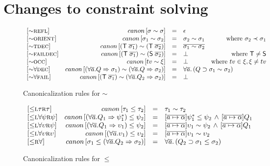 \documentclass[12pt]{article}
\begin{document}
\section{Changes to constraint solving}

\begin{figure}
$$
\begin{array}{lrclr}
\textsc{[$\sim$refl]} & canon\left[\sigma \sim \sigma\right] & = & \epsilon \\
\textsc{[$\sim$orient]} & canon\left[\sigma_1 \sim \sigma_2\right] & = & \sigma_2 \sim \sigma_1
& \textrm{where } \sigma_2 \prec \sigma_1 \\
\textsc{[$\sim$tdec]} & canon\left[(\mathsf{T} \; \overline{\sigma_1}) \sim (\mathsf{T} \; \overline{\sigma_2})\right] & = & \overline{\sigma_1 \sim \sigma_2} \\
\textsc{[$\sim$faildec]} & canon\left[(\mathsf{T} \; \overline{\sigma_1}) \sim (\mathsf{S} \; \overline{\sigma_2})\right] & = & \bot
 & \textrm{where } \mathsf{T} \neq \mathsf{S} \\
\textsc{[$\sim$occ]} & canon\left[tv \sim \xi \right] & = & \bot & \textrm{where } tv \in \xi, \xi \neq tv \\
\textsc{[$\sim$$\forall$dec]} & canon\left[(\forall \overline{a}. Q \Rightarrow \sigma_1) \sim (\forall \overline{a}. Q \Rightarrow \sigma_2)\right] & = & \multicolumn{2}{l}{\forall \overline{a}. \, (Q \supset \sigma_1 \sim \sigma_2)} \\
\textsc{[$\sim$$\forall$fail]} & canon\left[(\mathsf{T} \; \overline{\sigma_1}) \sim (\forall \overline{a}. Q_2 \Rightarrow \sigma_2)\right] & = & \bot \\
\end{array}
$$
\caption{Canonicalization rules for $\sim$}
\label{fig:sim}
\end{figure}

\begin{figure}
$$
\begin{array}{lrcl}
\textsc{[$\leq$l$\tau$r$\tau$]} & canon\left[\tau_1 \leq \tau_2\right] & = & \tau_1 \sim \tau_2 \\
\textsc{[$\leq$l$\forall\psi$r$\psi$]} & canon\left[(\forall \overline{a}. Q_1 \Rightarrow \psi^*_1) \leq \psi_2\right] & = & [\overline{a \mapsto \alpha}]\psi^*_1 \leq \psi_2 \, \wedge \, [\overline{a \mapsto \alpha}]Q_1 \\
\textsc{[$\leq$l$\forall\upsilon$r$\psi$]} & canon\left[(\forall \overline{a}. Q_1 \Rightarrow \upsilon_1) \leq \psi_2\right] & = & [\overline{a \mapsto \alpha}]\upsilon_1 \sim \psi_2 \, \wedge \, [\overline{a \mapsto \alpha}]Q_1 \\
\textsc{[$\leq$l$\forall\upsilon$r$\upsilon$]} & canon\left[(\forall \overline{a}. \upsilon_1) \leq \upsilon_2\right] & = & [\overline{a \mapsto \alpha}]\upsilon_1 \sim \upsilon_2 \\
\textsc{[$\leq$r$\forall$]} & canon\left[\sigma_1 \leq (\forall \overline{a}. Q_2 \Rightarrow \sigma_2)\right] & = & \forall \overline{a}. \, (Q_2 \supset \sigma_1 \leq \sigma_2) \\
\end{array}
$$
\caption{Canonicalization rules for $\leq$}
\label{fig:leq}
\end{figure}
\end{document}
